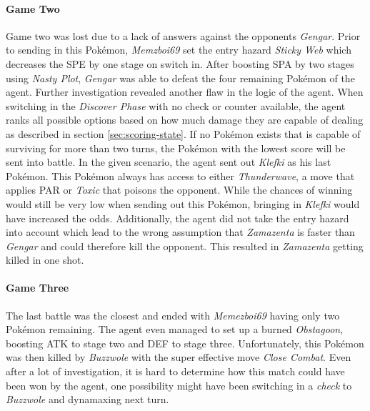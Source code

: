 \paragraph{Game Two}
Game two was lost due to a lack of answers against the opponents \textit{Gengar}. Prior to sending in this Pokémon,
\textit{Memzboi69} set the entry hazard \textit{Sticky Web} which decreases the \ac{SPE} by one stage on switch in.
After boosting \ac{SPA} by two stages using \textit{Nasty Plot}, \textit{Gengar} was able to defeat the four 
remaining Pokémon of the agent. Further investigation revealed another flaw in the logic of the agent. When switching
in the \textit{Discover Phase} with no check or counter available, the agent ranks all possible options based on how 
much damage they are capable of dealing as described in section \ref{sec:scoring-state}.
If no Pokémon exists that is capable of surviving for more than two turns, the Pokémon with the lowest score will
be sent into battle. In the given scenario, the agent sent out \textit{Klefki} as his last Pokémon. This Pokémon
always has access to either \textit{Thunderwave}, a move that applies \ac{PAR} or \textit{Toxic} that poisons the
opponent. While the chances of winning would still be very low when sending out this Pokémon, bringing in \textit{Klefki}
would have increased the odds. Additionally, the agent did not take the entry hazard into account which lead to
the wrong assumption that \textit{Zamazenta} is faster than \textit{Gengar} and could therefore kill the opponent.
This resulted in \textit{Zamazenta} getting killed in one shot.

\paragraph{Game Three}
The last battle was the closest and ended with \textit{Memezboi69} having only two Pokémon remaining. The agent
even managed to set up a burned \textit{Obstagoon}, boosting \ac{ATK} to stage two and \ac{DEF} to stage three.
Unfortunately, this Pokémon was then killed by \textit{Buzzwole} with the super effective move \textit{Close Combat}.
Even after a lot of investigation, it is hard to determine how this match could have been won by the agent, one 
possibility might have been switching in a \textit{check} to \textit{Buzzwole} and dynamaxing next turn. 